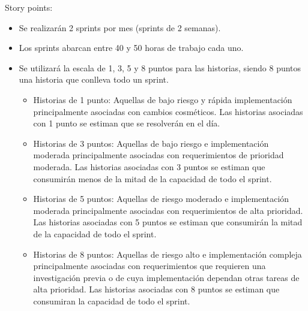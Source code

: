 \documentclass[11pt]{charter}
\begin{document}
Story points:
\begin{itemize}
\item Se realizarán 2 sprints por mes (sprints de 2 semanas).
\item Los sprints abarcan entre 40 y 50 horas de trabajo cada uno.
\item Se utilizará la escala de 1, 3, 5 y 8 puntos para las historias, siendo 8 puntos una historia que conlleva todo un sprint.
\begin{itemize}
\item Historias de 1 punto: Aquellas de bajo riesgo y rápida implementación principalmente asociadas con cambios cosméticos. Las historias asociadas con 1 punto se estiman que se resolverán en el día.
\item Historias de 3 puntos: Aquellas de bajo riesgo e implementación moderada principalmente asociadas con requerimientos de prioridad moderada. Las historias asociadas con 3 puntos se estiman que consumirán menos de la mitad de la capacidad de todo el sprint.
\item Historias de 5 puntos: Aquellas de riesgo moderado e implementación moderada principalmente asociadas con requerimientos de alta prioridad. Las historias asociadas con 5 puntos se estiman que consumirán la mitad de la capacidad de todo el sprint.
\item Historias de 8 puntos: Aquellas de riesgo alto e implementación compleja principalmente asociadas con requerimientos que requieren una investigación previa o de cuya implementación dependan otras tareas de alta prioridad. Las historias asociadas con 8 puntos se estiman que consumiran la capacidad de todo el sprint.
\end{itemize}
\end{itemize}

\newpage
\end{document}

